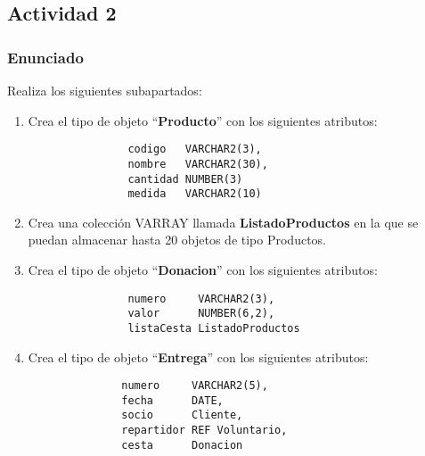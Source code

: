 \subsection{Actividad 2}

\subsubsection{Enunciado}
Realiza los siguientes subapartados:

\begin{enumerate}[label=\alph*)]
    \item Crea el tipo de objeto ``\textbf{Producto}'' con los siguientes atributos:

     \begin{figure}[H]
        \begin{tcolorbox}[sharp corners, colback=yellow!30, colframe=white!20]
            \scriptsize
            \begin{verbatim}
          codigo   VARCHAR2(3),
          nombre   VARCHAR2(30),
          cantidad NUMBER(3)
          medida   VARCHAR2(10)\end{verbatim}
        \end{tcolorbox}
    \end{figure}

    \item Crea una colección VARRAY llamada \textbf{ListadoProductos} en la que se puedan almacenar hasta 20 objetos de tipo Productos.

    \item Crea el tipo de objeto ``\textbf{Donacion}'' con los siguientes atributos:

     \begin{figure}[H]
    \begin{tcolorbox}[sharp corners, colback=yellow!30, colframe=white!20]
        \scriptsize
        \begin{verbatim}
          numero     VARCHAR2(3),
          valor      NUMBER(6,2),
          listaCesta ListadoProductos\end{verbatim}
    \end{tcolorbox}
\end{figure}

    \item Crea el tipo de objeto ``\textbf{Entrega}'' con los siguientes atributos:

    \begin{figure}[H]
        \begin{tcolorbox}[sharp corners, colback=yellow!30, colframe=white!20]
            \scriptsize
            \begin{verbatim}
         numero     VARCHAR2(5),
         fecha      DATE,
         socio      Cliente,
         repartidor REF Voluntario,
         cesta      Donacion\end{verbatim}
        \end{tcolorbox}
    \end{figure}
\end{enumerate}

